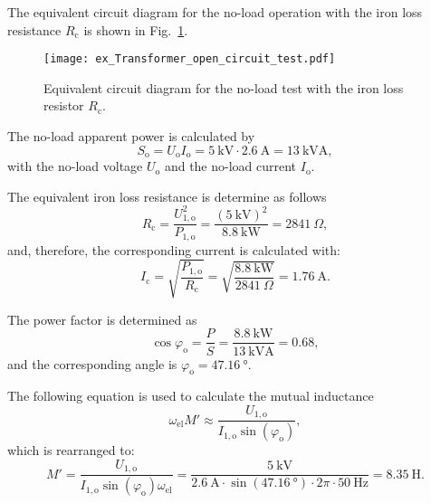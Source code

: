 \begin{solutionblock}

  The equivalent circuit diagram for the no-load operation with the iron loss resistance $R_{\mathrm{c}}$ is shown in Fig.~\ref{fig:ex_transformer_open_circuit_test}.
  \begin{figure}[htb]
    \centering
    \texttt{[image: ex\_Transformer\_open\_circuit\_test.pdf]}
    \caption{Equivalent circuit diagram for the no-load test with the iron loss resistor $R_{\mathrm{c}}$.}
    \label{fig:ex_transformer_open_circuit_test}
  \end{figure}
  
  
  The no-load apparent power is calculated by
  \begin{equation}
    S_{\mathrm{o}} = U_{\mathrm{o}} I_{\mathrm{o}}
    = \SI{5}{\kilo\volt} \cdot \SI{2.6}{\ampere}
    = \SI{13}{\kilo\volt\ampere},
  \end{equation}
  with the no-load voltage $U_{\mathrm{o}}$ and the no-load current $I_{\mathrm{o}}$.

  The equivalent iron loss resistance is determine as follows
  \begin{equation}
    R_{\mathrm{c}} = \frac{U_{\mathrm{1,o}}^2}{P_{\mathrm{1,o}}}
    = \frac{\left(\SI{5}{\kilo\volt} \right)^2}{\SI{8.8}{\kilo\watt}}
    = \SI{2841}{\Omega},
  \end{equation}
  and, therefore, the corresponding current is calculated with:
  \begin{equation}
    I_{\mathrm{c}} = \sqrt{\frac{P_{\mathrm{1,o}}}{R_{\mathrm{c}}}}
    = \sqrt{\frac{\SI{8.8}{\kilo\watt}}{\SI{2841}{\Omega}}}
    = \SI{1.76}{\ampere}.
  \end{equation}

  The power factor is determined as
  \begin{equation}
    \cos \varphi_{\mathrm{o}} = \frac{P}{S}
    = \frac{\SI{8.8}{\kilo\watt}}{\SI{13}{\kilo\volt\ampere}}
    = 0.68,
  \end{equation}
  and the corresponding angle is $\varphi_{\mathrm{o}} = \SI{47.16}{\degree}$.

  The following equation is used to calculate the mutual inductance
  \begin{equation}
    \omega_{\mathrm{el}} M' \approx \frac{U_{\mathrm{1,o}}}{I_{\mathrm{1,o}} \sin(\varphi_{\mathrm{o}})},
  \end{equation}
  which is rearranged to:
  \begin{equation}
    M' = \frac{U_{\mathrm{1,o}}}{I_{\mathrm{1,o}} \sin(\varphi_{\mathrm{o}}) \omega_{\mathrm{el}}}
    = \frac{\SI{5}{\kilo\volt}}{\SI{2.6}{\ampere}\cdot \sin(\SI{47.16}{\degree})\cdot 2\pi \cdot \SI{50}{\hertz}}
    = \SI{8.35}{\henry}.
  \end{equation}


\end{solutionblock}

